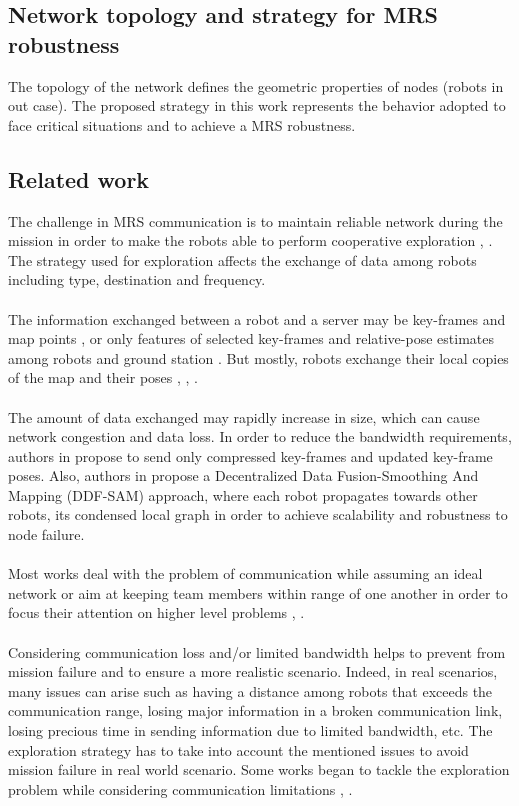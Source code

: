 \documentclass[11pt,openany]{book}
\begin{document}
\begin{algorimth}[H]
\section{Network topology and strategy for MRS robustness}
The topology of the network defines the geometric properties of nodes (robots in out case). The proposed strategy in this work represents the behavior adopted to face critical situations and to achieve a MRS robustness.
\subsection{Related work}
The challenge in MRS communication is to maintain reliable network during the mission in order to make the robots able to perform cooperative exploration \cite{rooker2007multi}, \cite{gupta2015survey}. The strategy used for exploration affects the exchange of data among robots including type, destination and frequency.\\\\
The information exchanged between a robot and a server may be key-frames and map points \cite{schmuck2017multi}, or only features of selected key-frames and relative-pose estimates among robots and ground station \cite{forster2013collaborative}. But mostly, robots exchange their local copies of the map and their poses \cite{fox2006distributed}, \cite{bresson2015general}, \cite{schuster2015multi}.\\\\
The amount of data exchanged may rapidly increase in size, which can cause network congestion and data loss. In order to reduce the bandwidth requirements, authors in \cite{mohanarajah2015cloud} propose to send only compressed key-frames and updated key-frame poses. Also, authors in \cite{cunningham2010ddf} propose a Decentralized Data Fusion-Smoothing And Mapping (DDF-SAM) approach, where each robot propagates towards other robots, its condensed local graph in order to achieve scalability and robustness to node failure.\\\\
Most works deal with the problem of communication while assuming an ideal network or aim at keeping team members within range of one another in order to focus their attention on higher level problems \cite{scherer2015autonomous}, \cite{burgard2005coordinated}.\\\\
Considering communication loss and/or limited bandwidth helps to prevent from mission failure and to ensure a more realistic scenario. Indeed, in real scenarios, many issues can arise such as having a distance among robots that exceeds the communication range, losing major information in a broken communication link, losing precious time in sending information due to limited bandwidth, etc. The exploration strategy has to take into account the mentioned issues to avoid mission failure in real world scenario. Some works began to tackle the exploration problem while considering communication limitations \cite{couceiro2014darwinian}, \cite{schmuck2017multi}.\\\\

\end{algorimth}
\end{document}
